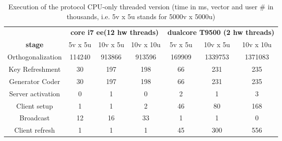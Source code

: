 \documentclass[a4paper,11pt]{amsart}
\theoremstyle{definition}
\begin{document}
\begin{table*}[htpb]
  \caption{Execution of the protocol CPU-only threaded version (time in ms, vector and user \# in thousands, i.e. 5v x 5u stands for 5000v x 5000u)} 
\centering \small \begin{tabular}{|c | c c c | c c c|} \hline\hline \multicolumn{1}{|c}{} & \multicolumn{3}{|c|}{{\bfseries core i7 ee(12 hw threads)}} & \multicolumn{3}{|c|}{{\bfseries dualcore T9500 (2 hw threads)}}  \\
    {\bfseries stage} & 5v x 5u & 10v x 5u & 10v x 10u & 5v x 5u & 10v x 5u & 10v x 10u\\[0.5ex] \hline Orthogonalization   & 114240    & 913866    & 913596    & 169909    & 1339753   & 1371083 \\ Key Refreshment     & 30        & 197       & 198   & 66        & 231       & 235 \\
    Generator Coder     & 30        & 197       & 198   & 66            & 231       & 235 \\
    Server activation   & 0         & 1         & 0     & 2             & 1         & 3  \\
    Client setup      & 1         & 1         & 2   & 46            & 80        & 168 \\
    Broadcast   & 12        & 16        & 33    & 1 & 1 & 0 \\
    Client refresh & 1        & 1         & 1 & 45       & 300       & 556 \\
    \hline \end{tabular}
  \label{table:th_i7_t9500} \end{table*}
\end{document}
